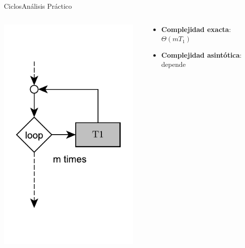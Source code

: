\documentclass[spanish, c]{beamer}
\begin{document}
\begin{frame}{Ciclos}{Análisis Práctico}
    
    \begin{columns}
        \begin{column}{0.35\textwidth}
            \begin{center}
                \includegraphics[width=0.95\textwidth]{loop-times.pdf}
            \end{center}
        \end{column}
        \begin{column}{0.65\textwidth}
            \hspace{-1in}
            \begin{itemize}
                \item \textbf{Complejidad exacta}: $\Theta(m T_1)$
                \item \textbf{Complejidad asintótica}: \alert{depende}
            \end{itemize}


\end{column}
\end{columns}
\end{frame}
\end{document}
